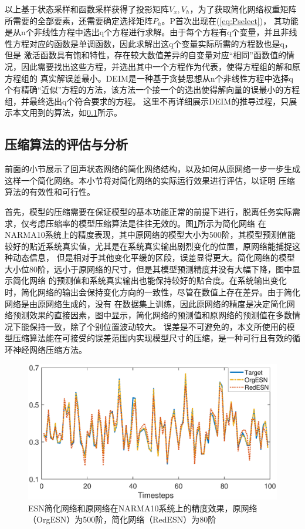 以上基于状态采样和函数采样获得了投影矩阵\(V_x,V_h\)，为了获取简化网络权重矩阵所需要的全部要素，还需要确定选择矩阵\(P_h\)。P首次出现在(\ref{eq:Pselect})，
其功能是从n个非线性方程中选出q个方程进行求解。由于每个方程有q个变量，并且非线性方程对应的函数是单调函数，因此求解出这q个变量实际所需的方程数也是q，但是
激活函数具有饱和特性，存在较大数值差异的自变量对应“相同”函数值的情况，因此需要找出这些方程，并选出其中一个方程作为代表，使得方程组的解和原方程组的
真实解误差最小。DEIM是一种基于贪婪思想从n个非线性方程中选择q个有精确“近似”方程的方法，该方法一个接一个的选出使得解向量的误最小的方程组，并最终选出q个符合要求的方程。
这里不再详细展示DEIM的推导过程，只展示本文用到的算法，如\ref{}所示。
\subsection{压缩算法的评估与分析}
前面的小节展示了回声状态网络的简化网络结构，以及如何从原网络一步一步生成这样一个简化网络。本小节将对简化网络的实际运行效果进行评估，以证明
压缩算法的有效性和可行性。

首先，模型的压缩需要在保证模型的基本功能正常的前提下进行，脱离任务实际需求，仅考虑压缩率的模型压缩算法是往往无效的。图\ref{fig:accuracy}所示为简化网络
在NARMA10系统上的精度表现，其中原网络的模型大小为500阶，其模型预测值能较好的贴近系统真实值，尤其是在系统真实输出剧烈变化的位置，原网络能捕捉这种动态信息，
但是相对于其他变化平缓的区段，误差显得更大。简化网络的模型大小位80阶，远小于原网络的尺寸，但是其模型预测精度并没有大幅下降，图中显示简化网络
的预测值和系统真实输出也能保持较好的贴合度。在系统输出变化时，简化网络的输出会保持变化方向的一致性，尽管在数值上存在差异。由于简化网络是由原网络生成的，没有
在数据集上训练，因此原网络的精度是决定简化网络预测效果的直接因素，图中显示，简化网络的预测值和原网络的预测值在多数情况下能保持一致，除了个别位置波动较大。
误差是不可避免的，本文所使用的模型压缩算法能在可接受的误差范围内实现模型尺寸的压缩，是一种可行且有效的循环神经网络压缩方法。
\begin{figure}
	\centering
	\includegraphics[width=1.0\columnwidth]{exp/500&80_all.eps}
	\caption{ESN简化网络和原网络在NARMA10系统上的精度效果，原网络（OrgESN）为500阶，简化网络（RedESN）为80阶}
	\label{fig:accuracy}
\end{figure}

